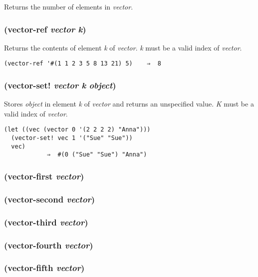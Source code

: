\documentclass{article}
\begin{document}
Returns the number of elements in \emph{vector}.

\subsubsection{(vector-ref \emph{vector} \emph{k})}

Returns the contents of element \emph{k} of \emph{vector}. \emph{k} must be a valid index of
\emph{vector}.

\begin{verbatim}
(vector-ref '#(1 1 2 3 5 8 13 21) 5)    ⇒  8
\end{verbatim}

\subsubsection{(vector-set! \emph{vector} \emph{k} \emph{object})}

Stores \emph{object} in element \emph{k} of \emph{vector} and returns an unspecified value.
\emph{K} must be a valid index of \emph{vector}.

\begin{verbatim}
(let ((vec (vector 0 '(2 2 2 2) "Anna")))
  (vector-set! vec 1 '("Sue" "Sue"))
  vec)
            ⇒  #(0 ("Sue" "Sue") "Anna")
\end{verbatim}

\subsubsection{(vector-first \emph{vector})}

\subsubsection{(vector-second \emph{vector})}

\subsubsection{(vector-third \emph{vector})}

\subsubsection{(vector-fourth \emph{vector})}

\subsubsection{(vector-fifth \emph{vector})}
\end{document}
